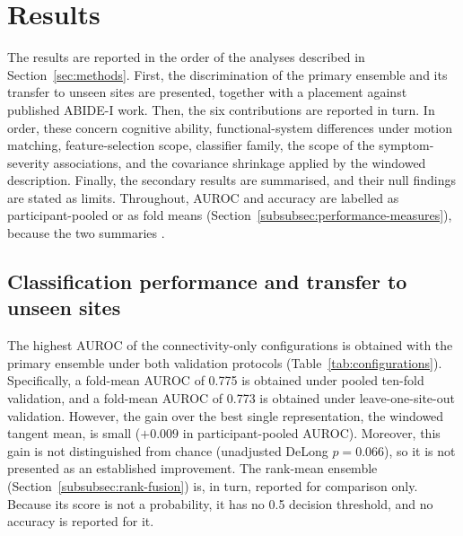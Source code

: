 \section{Results}
\label{sec:results}

The results are reported in the order of the analyses described in
Section~\ref{sec:methods}. First, the discrimination of the primary ensemble and its
transfer to unseen sites are presented, together with a placement against published
ABIDE-I work. Then, the six contributions are reported in turn. In order, these concern
cognitive ability, functional-system differences under motion matching, feature-selection
scope, classifier family, the scope of the symptom-severity associations, and the covariance
shrinkage applied by the windowed description. Finally, the secondary results are summarised,
and their null findings are stated as limits. Throughout, AUROC and accuracy are labelled as
participant-pooled or as fold means (Section~\ref{subsubsec:performance-measures}), because the two summaries
.

\subsection{Classification performance and transfer to unseen sites}
\label{subsec:results-performance}

The highest AUROC of the connectivity-only configurations is obtained with the primary
ensemble under both validation protocols (Table~\ref{tab:configurations}). Specifically, a
fold-mean AUROC of 0.775 is obtained under pooled ten-fold validation, and a fold-mean
AUROC of 0.773 is obtained under leave-one-site-out validation. However, the gain over the
best single representation, the windowed tangent mean, is small ($+0.009$ in
participant-pooled AUROC).
Moreover, this gain is not distinguished from chance (unadjusted DeLong $p=0.066$), so it
is not presented as an established improvement. The rank-mean ensemble
(Section~\ref{subsubsec:rank-fusion}) is, in turn, reported for comparison only. Because its score is
not a probability, it has no 0.5 decision threshold, and no accuracy is reported for it.

